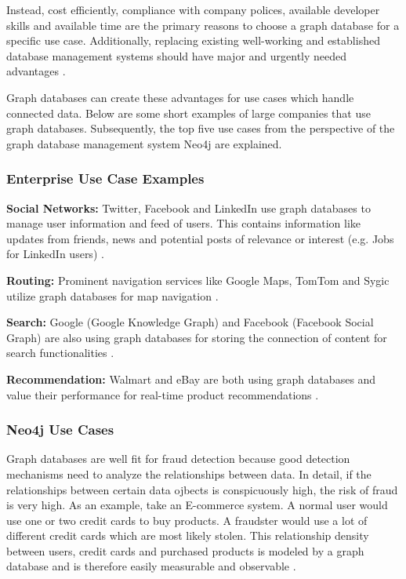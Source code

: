 Instead, cost efficiently, compliance with company polices, available developer skills and available time are the primary reasons to choose a graph database for a specific use case. Additionally, replacing existing well-working and established database management systems should have major and urgently needed advantages \autocite{graphdb2015}.

Graph databases can create these advantages for use cases which handle connected data. Below are some short examples of large companies that use graph databases. Subsequently, the top five use cases from the perspective of the graph database management system Neo4j are explained.

\subsubsection{Enterprise Use Case Examples}
\textbf{Social Networks:} Twitter, Facebook and LinkedIn use graph databases to manage user information and feed of users. This contains information like updates from friends, news and potential posts of relevance or interest (e.g. Jobs for LinkedIn users) \autocite{maheshlal2015}.

\textbf{Routing:} Prominent navigation services like Google Maps, TomTom and Sygic utilize graph databases for map navigation \autocite{maheshlal2015}.

\textbf{Search:} Google (Google Knowledge Graph) and Facebook (Facebook Social Graph) are also using graph databases for storing the connection of content for search functionalities \autocite{maheshlal2015}.

\textbf{Recommendation:} Walmart and eBay are both using graph databases and value their performance for real-time product recommendations \autocite{neo4j:use_cases}.

\subsubsection{Neo4j Use Cases}

Graph databases are well fit for fraud detection because good detection mechanisms need to analyze the relationships between data. In detail, if the relationships between certain data ojbects is conspicuously high, the risk of fraud is very high.  As an example, take an E-commerce system. A normal user would use one or two credit cards to buy products. A fraudster would use a lot of different credit cards which are most likely stolen. This relationship density between users, credit cards and purchased products is modeled by a graph database and is therefore easily measurable and observable \autocite{neo4j:use_cases}.

